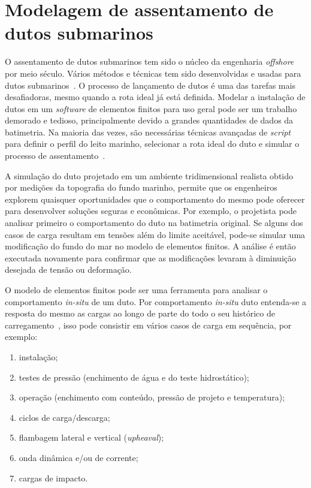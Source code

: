 \chapter{Modelagem de assentamento de dutos submarinos}
\label{chap:assentamento}


O assentamento de dutos submarinos tem sido o núcleo da engenharia \textit{offshore} por meio século.
Vários métodos e técnicas tem sido desenvolvidas e usadas para dutos submarinos~\cite{Ivic2016}.
O processo de lançamento de dutos é uma das tarefas mais desafiadoras, mesmo quando a rota ideal já está definida.
Modelar a instalação de dutos em um \textit{software} de elementos finitos para uso geral pode ser um trabalho demorado e tedioso, principalmente devido a grandes quantidades de dados da batimetria.
Na maioria das vezes, são necessárias técnicas avançadas de \textit{script} para definir o perfil do leito marinho, selecionar a rota ideal do duto e simular o processo de assentamento~\cite{VandenAbeele2013}.

A simulação do duto projetado em um ambiente tridimensional realista obtido por medições da topografia do fundo marinho, permite que os engenheiros explorem quaisquer oportunidades que o comportamento do mesmo pode oferecer para desenvolver soluções seguras e econômicas.
Por exemplo, o projetista pode analisar primeiro o comportamento do duto na batimetria original.
Se alguns dos casos de carga resultam em tensões além do limite aceitável, pode-se simular uma modificação do fundo do mar no modelo de elementos finitos.
A análise é então executada novamente para confirmar que as modificações levaram à diminuição desejada de tensão ou deformação.

O modelo de elementos finitos pode ser uma ferramenta para analisar o comportamento \textit{in-situ} de um duto.
Por comportamento \textit{in-situ} duto entenda-se a resposta do mesmo as cargas ao longo de parte do todo o seu histórico de carregamento~\cite{Bai2014}, isso pode consistir em vários casos de carga em sequência, por exemplo:

\begin{enumerate}
    \item instalação;
    \item testes de pressão (enchimento de água e do teste hidrostático);
    \item operação (enchimento com conteúdo, pressão de projeto e temperatura);
    \item ciclos de carga/descarga;
    \item flambagem lateral e vertical (\textit{upheaval});
    \item onda dinâmica e/ou de corrente;
    \item cargas de impacto.
\end{enumerate}

